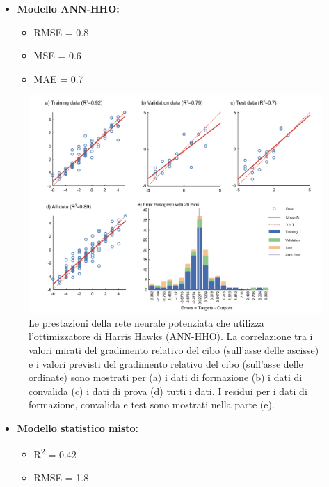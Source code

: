 \newpage
\begin{itemize}
       \item \textbf{Modello ANN-HHO:}
            \begin{itemize}
                  \item RMSE = 0.8
                  \item MSE = 0.6
                  \item MAE = 0.7
            \end{itemize}
\end{itemize}

\begin{figure}[H]
      \captionsetup{font=scriptsize}
      \centering
      \includegraphics[width=1\textwidth]{Chapters/Figures/ann-hho-result.png} 
      \caption{\small Le prestazioni della rete neurale potenziata che utilizza l'ottimizzatore di Harris Hawks (ANN-HHO). La correlazione tra i valori mirati del gradimento relativo del cibo (sull'asse delle ascisse) e i valori previsti del gradimento relativo del cibo (sull'asse delle ordinate) sono mostrati per (a) i dati di formazione (b) i dati di convalida (c) i dati di prova (d) tutti i dati. I residui per i dati di formazione, convalida e test sono mostrati nella parte (e).}
      \label{fig:ann-hho-abc}
\end{figure}

\begin{itemize}
      \item \textbf{Modello statistico misto:}
            \begin{itemize}
                  \item R\textsuperscript{2} = 0.42
                  \item RMSE = 1.8
            \end{itemize}
\end{itemize}

